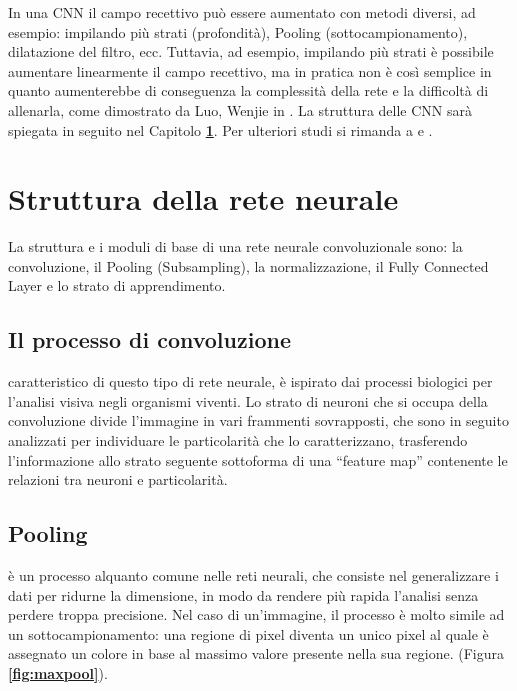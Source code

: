 In una CNN il campo recettivo può essere aumentato con metodi diversi, ad esempio: impilando più strati (profondità), Pooling (sottocampionamento), dilatazione del filtro, ecc. Tuttavia, ad esempio, impilando più strati è possibile aumentare linearmente il campo recettivo, ma in pratica non è così semplice in quanto aumenterebbe di conseguenza la complessità della rete e la difficoltà di allenarla, come dimostrato da Luo, Wenjie in \cite{NIPS2016_6203}.
La struttura delle CNN sarà spiegata in seguito nel Capitolo \textbf{\ref{strutturadellarete}}.
Per ulteriori studi si rimanda a \cite[326-366]{Goodfellow-et-al-2016} e \cite{Dumoulin2016AGT}.\\

\section{Struttura della rete neurale}\label{strutturadellarete}

La struttura e i moduli di base di una rete neurale convoluzionale sono: la convoluzione, il Pooling (Subsampling), la normalizzazione, il Fully Connected Layer e lo strato di apprendimento.

\subsection{Il processo di convoluzione} caratteristico di questo tipo di rete neurale, è ispirato dai processi biologici per l’analisi visiva negli organismi viventi. Lo strato di neuroni che si occupa della convoluzione divide l’immagine in vari frammenti sovrapposti, che sono in seguito analizzati per individuare le particolarità che lo caratterizzano, trasferendo l’informazione allo strato seguente sottoforma di una “feature map” contenente le relazioni tra neuroni e particolarità.

\subsection{Pooling} è un processo alquanto comune nelle reti neurali, che consiste nel generalizzare i dati per ridurne la dimensione, in modo da rendere più rapida l’analisi senza perdere troppa precisione. Nel caso di un’immagine, il processo è molto simile ad un sottocampionamento: una regione di pixel diventa un unico pixel al quale è assegnato un colore in base al massimo valore presente nella sua regione. (Figura \textbf{\ref{fig:maxpool}}).

